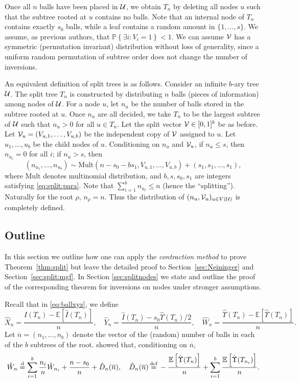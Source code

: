 \documentclass[11pt]{article}
\newcommand{\E}[1]{\mathbb{E} \left[#1\right]}
\newcommand{\ball}[1]{\hat{#1}}
\def\bI{\ball{I}}
\def\bX{\ball{X}}
\def\bY{\ball{Y}}
\def\bW{\ball{W}}
\def\bU{\ball{\Upsilon}}
\newcommand\cU{{\cal U}}
\newcommand\cV{{\cal V}}
\newcommand\Prob[1]{{\mathbb{P}\left\{#1\right\}}}
\numberwithin{theorem}{section}
\theoremstyle{definition}
\newcommand{\eqd}{\,{\buildrel {\mathrm{def}} \over =}\,}
\newcommand{\nBar}{\overline{n}}
\newcommand{\Toll}{D}
\newcommand{\bToll}{\ball{\Toll}}
\newcommand{\bTollN}{\bToll_{n}}
\numberwithin{equation}{section}
\newcommand{\refT}[1]{Theorem~\ref{#1}}
\newcommand{\refS}[1]{Section~\ref{#1}}
\newcommand\eqdd{\overset{\mathrm{d}}{=}}
\begin{document}
Once all $n$ balls have been placed in $\cU$, we obtain $T_n$ by deleting
all nodes $u$ such that the subtree rooted at $u$ contains no balls. Note
that 
 an internal node of $T_n$ contains exactly $s_0$ balls, while a leaf
contains a random amount in $\{1,\dots,s\}$. We assume, as previous authors,
that $\Prob{\exists i : V_i = 1} < 1$. 
 We can assume \(\cV\) has a symmetric (permutation invariant) distribution
without loss of generality, since a uniform random permutation 
of subtree order does not change the number of inversions. 

An equivalent definition of split trees is as follows.  Consider an infinite \(b\)-ary tree \(\cU\).
The split tree \(T_n\) is constructed by distributing \(n\) balls (pieces of information) among
nodes of \(\cU\). For a node \(u\), let \(n_u\) be the number of balls stored in the subtree rooted
at \(u\). Once \(n_u\) are all decided, we take \(T_n\) to be the largest subtree of \(\cU\) such
that \(n_u > 0\) for all \(u \in T_n\).
Let the split vector \(\cV \in [0,1]^b\) be as before. 
Let \(\cV_u = (V_{u,1},\dots,V_{u,b})\) be the independent copy of \(\cV\) assigned to \(u\). Let
\(u_1,\dots,u_b\) be the child nodes of \(u\). Conditioning on \(n_u\) and
\(\cV_u\),
 if $n_u\le s$, then $n_{u_i}=0$ for all $i$;
if $n_u>s$, then
\[
    (n_{u_1}, \dots, n_{u_{b}}) 
    \sim 
    \mathrm{Mult}(n-s_0-bs_{1}, V_{u,1}, \dots, V_{u, b}) 
    +
    (s_{1}, s_{1},\dots, s_{1}),
\]
where \(\mathrm{Mult}\) denotes multinomial distribution, and \(b, s, s_{0}, s_{1}\) are integers
satisfying \eqref{eq:split:para}. Note that \(\sum_{i=1}^b n_{u_i} \le n\) (hence the ``splitting'').
Naturally for the root \(\rho\), \(n_{\rho}=n\). Thus the distribution of \((n_{u}, \cV_{u})_{u \in V(\cU)}\) is completely defined.

\subsection{Outline}\label{sec:splitoutline}

In this section we outline how one can apply the \emph{contraction method} to prove \refT{thm:split} but leave
the detailed proof to \refS{sec:Neininger} and \refS{sec:split:mgf}. In Section \ref{sec:splitnodes} we state and
outline the proof of the corresponding theorem for inversions on nodes under
stronger assumptions.

Recall that in \eqref{eq:ballxyz}, we define
\begin{equation}
\bX_n = \frac{\bI(T_n) - \E{\bI(T_n)}}{n}, 
\quad \bY_n = \frac{\bI(T_n) - s_0\bU(T_n)/2}{n}, 
\quad \bW_n = \frac{\bU(T_n) - \E{\bU(T_n)}}{n}.
\end{equation}
Let \(\nBar = (n_{1},\dots,n_{b})\) denote the vector of the (random) number of balls in each of the
\(b\) subtrees of the root.  \citet{MR3025680} showed that, conditioning on \(\nBar\), 
\begin{equation}
\bW_n 
\eqdd 
\sum_{i=1}^b \frac{n_i}{n} \bW_{n_i} 
+ 
\frac{n-s_0}{n} 
+ 
\bTollN(\nBar), 
\quad 
\bTollN(\nBar) 
\eqd 
- \frac{\E{\bU(T_n)}}{n} +
\sum_{i=1}^b \frac{\E{\bU(T_{n_i})}}{n}
.
\label{eq:n:tollfunction:ball:W}
\end{equation}
\end{document}
